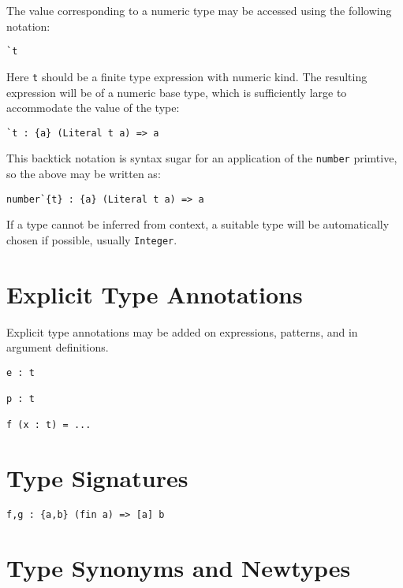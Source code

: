 The value corresponding to a numeric type may be accessed using the
following notation:

\begin{verbatim}
`t
\end{verbatim}

Here \texttt{t} should be a finite type expression with numeric kind.
The resulting expression will be of a numeric base type, which is
sufficiently large to accommodate the value of the type:

\begin{verbatim}
`t : {a} (Literal t a) => a
\end{verbatim}

This backtick notation is syntax sugar for an application of the
\texttt{number} primtive, so the above may be written as:

\begin{verbatim}
number`{t} : {a} (Literal t a) => a
\end{verbatim}

If a type cannot be inferred from context, a suitable type will be
automatically chosen if possible, usually \texttt{Integer}.

\hypertarget{explicit-type-annotations}{%
\section{Explicit Type Annotations}\label{explicit-type-annotations}}

Explicit type annotations may be added on expressions, patterns, and in
argument definitions.

\begin{verbatim}
e : t

p : t

f (x : t) = ...
\end{verbatim}

\hypertarget{type-signatures}{%
\section{Type Signatures}\label{type-signatures}}

\begin{verbatim}
f,g : {a,b} (fin a) => [a] b
\end{verbatim}

\hypertarget{type-synonyms-and-newtypes}{%
\section{Type Synonyms and Newtypes}\label{type-synonyms-and-newtypes}}

